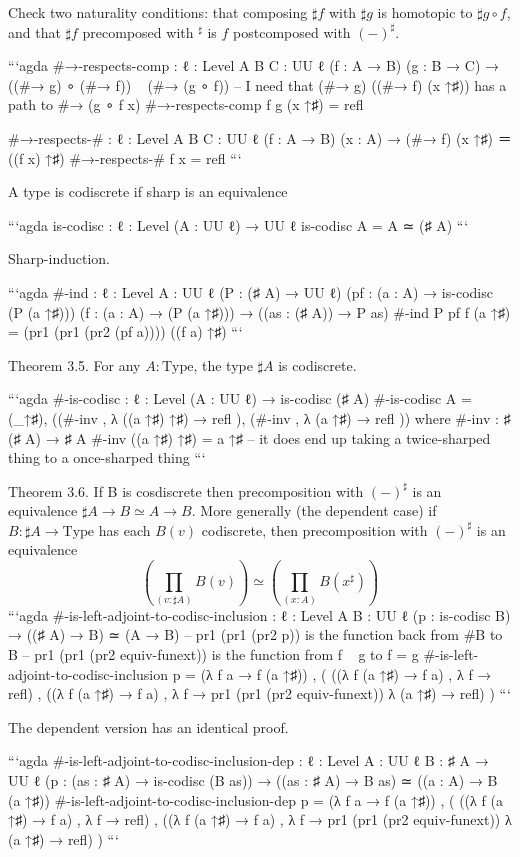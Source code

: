 Check two naturality conditions: that composing $♯f$ with $♯g$ is homotopic to $♯g∘f$, and that $♯f$ precomposed with ${}^♯$ is $f$ postcomposed with $(-)^♯$.

```agda
#→-respects-comp : {ℓ : Level} {A B C : UU ℓ} (f : A → B) (g : B → C) → 
  ((#→ g) ∘ (#→ f)) ~ (#→ (g ∘ f))
-- I need that (#→ g) ((#→ f) (x ↑♯)) has a path to #→ (g ∘ f x)
#→-respects-comp f g (x ↑♯) = refl

#→-respects-# : {ℓ : Level} {A B C : UU ℓ} (f : A → B) (x : A) → 
  (#→ f) (x ↑♯) ＝ ((f x) ↑♯)
#→-respects-# f x = refl
```

A type is codiscrete if sharp is an equivalence

```agda
is-codisc : {ℓ : Level} (A : UU ℓ) → UU ℓ
is-codisc A = A ≃ (♯ A)
```

Sharp-induction.

```agda
#-ind : 
  {ℓ : Level} {A : UU ℓ} (P : (♯ A) → UU ℓ) 
  (pf : (a : A) → is-codisc (P (a ↑♯))) 
  (f : (a : A) → (P (a ↑♯))) 
  → ((as : (♯ A)) → P as)
#-ind P pf f (a ↑♯) = (pr1 (pr1 (pr2 (pf a)))) ((f a) ↑♯)
```

Theorem 3.5. For any $A: \mathrm{Type}$, the type $♯ A$ is codiscrete.

```agda
#-is-codisc : {ℓ : Level} (A : UU ℓ) → is-codisc (♯ A)
#-is-codisc A = (_↑♯), ((#-inv , λ { ((a ↑♯) ↑♯) → refl }), (#-inv , λ { (a ↑♯) → refl }))
  where
  #-inv : ♯ (♯ A) → ♯ A
  #-inv ((a ↑♯) ↑♯) = a ↑♯ -- it does end up taking a twice-sharped thing to a once-sharped thing
```

Theorem 3.6. If B is cosdiscrete then precomposition with $(-)^\sharp$ is an equivalence $\sharp A → B \simeq A → B$. More generally (the dependent case) if $B:\sharp A → \mathrm{Type}$ has each $B(v)$ codiscrete, then precomposition with $(-)^\sharp$ is an equivalence $$\left(\prod_{(v:\sharp A)}B(v)\right) \simeq \left(\prod_{(x:A)}B(x^\sharp)\right)$$
```agda
#-is-left-adjoint-to-codisc-inclusion : {ℓ : Level} {A B : UU ℓ} (p : is-codisc B) → 
  ((♯ A) → B) ≃ (A → B)
-- pr1 (pr1 (pr2 p)) is the function back from #B to B
-- pr1 (pr1 (pr2 equiv-funext)) is the function from f ~ g to f = g
#-is-left-adjoint-to-codisc-inclusion p
  = (λ {f a → f (a ↑♯)}) , (
    ((λ {f (a ↑♯) → f a}) , λ f → refl) , 
    ((λ {f (a ↑♯) → f a}) , λ f → pr1 (pr1 (pr2 equiv-funext)) λ {(a ↑♯) → refl})
  )
```

The dependent version has an identical proof.

```agda
#-is-left-adjoint-to-codisc-inclusion-dep : {ℓ : Level} {A : UU ℓ} {B : ♯ A → UU ℓ} 
  (p : (as : ♯ A) → is-codisc (B as)) → ((as : ♯ A) → B as) ≃ ((a : A) → B (a ↑♯))
#-is-left-adjoint-to-codisc-inclusion-dep p 
  = (λ {f a → f (a ↑♯)}) , (
    ((λ {f (a ↑♯) → f a}) , λ f → refl) , 
    ((λ {f (a ↑♯) → f a}) , λ f → pr1 (pr1 (pr2 equiv-funext)) λ {(a ↑♯) → refl})
  )
```

